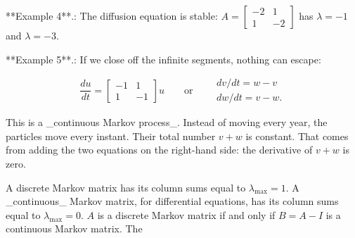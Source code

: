 **Example 4**.: The diffusion equation is stable: \(A=\begin{bmatrix}-2&1\\ 1&-2\end{bmatrix}\) has \(\lambda=-1\) and \(\lambda=-3\).

**Example 5**.: If we close off the infinite segments, nothing can escape:

\[\frac{du}{dt}=\begin{bmatrix}-1&1\\ 1&-1\end{bmatrix}u\qquad\text{or}\qquad\begin{array}{c}dv/dt=w-v\\ dw/dt=v-w.\end{array}\]

This is a _continuous Markov process_. Instead of moving every year, the particles move every instant. Their total number \(v+w\) is constant. That comes from adding the two equations on the right-hand side: the derivative of \(v+w\) is zero.

A discrete Markov matrix has its column sums equal to \(\lambda_{\max}=1\). A _continuous_ Markov matrix, for differential equations, has its column sums equal to \(\lambda_{\max}=0\). \(A\) is a discrete Markov matrix if and only if \(B=A-I\) is a continuous Markov matrix. The 
